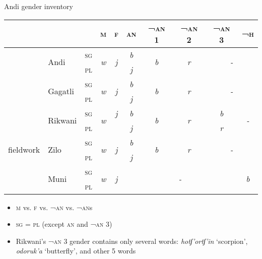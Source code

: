 \documentclass[13pt, t]{beamer}
\begin{document}
\begin{frame}{Andi gender inventory}
\small
\begin{tabular}{|l|l|c|c|c|c|c|c|c|c|}
\hline
\multicolumn{3}{|c|}{}  & \textsc{m} & \textsc{f} & \textsc{an} & \textsc{¬an} 1 & \textsc{¬an} 2 & \textsc{¬an} 3 & \textsc{¬h} \\ \hline
\multirow{2}{*}{\citep{alekseev99}} & \multirow{ 2}{*}{Andi} & \textsc{sg} & \multirow{2}{*}{\textit{w}} & \multirow{2}{*}{\textit{j}} & \textit{b} & \multirow{2}{*}{\textit{b}} & \multirow{2}{*}{\textit{r}} & \multicolumn{2}{|c|}{\multirow{2}{*}{\textit{-}}}  \\ \cline{3-3} \cline{6-6}
 &  & \textsc{pl} & \textit{} & \textit{} & \textit{j} & \textit{} & \textit{} & \multicolumn{2}{|c|}{} \\ \hline
\multirow{2}{*}{\citep{salimov10}} & \multirow{2}{*}{Gagatli} & \textsc{sg} & \multirow{2}{*}{\textit{w}} & \multirow{2}{*}{\textit{j}} & \textit{b} & \multirow{2}{*}{\textit{b}} & \multirow{2}{*}{\textit{r}} & \multicolumn{2}{|c|}{\multirow{2}{*}{\textit{-}}} \\ \cline{3-3} \cline{6-6}
 &  & \textsc{pl} & \textit{} & \textit{} & \textit{j} & \textit{} & \textit{} & \multicolumn{2}{|c|}{} \\ \hline
\multirow{2}{*}{\citep{suleymanov57}} & \multirow{2}{*}{Rikwani} & \textsc{sg} & \multirow{2}{*}{\textit{w}} & \textit{j} & \textit{b} & \multirow{2}{*}{\textit{b}} & \multirow{2}{*}{\textit{r}} & \textit{b} & \multirow{2}{*}{\textit{-}} \\ \cline{3-3} \cline{6-6} \cline{9-9}
 & & \textsc{pl} & \textit{} & \textit{} & \textit{j} & \textit{} & \textit{} & \textit{r} &  \\ \hline
\multirow{2}{*}{fieldwork} & \multirow{2}{*}{Zilo} & \textsc{sg} & \multirow{2}{*}{\textit{w}} & \multirow{2}{*}{\textit{j}} & \textit{b} & \multirow{2}{*}{\textit{b}} & \multirow{2}{*}{\textit{r}} & \multicolumn{2}{|c|}{\multirow{2}{*}{\textit{-}}}  \\ \cline{3-3} \cline{6-6}
 & & \textsc{pl} & \textit{} & \textit{} & \textit{j}& \textit{} & \textit{} & \multicolumn{2}{|c|}{}  \\ \hline
\multirow{2}{*}{\citep{suleymanov57}} & \multirow{2}{*}{Muni} & \textsc{sg} & \multirow{2}{*}{\textit{w}} & \multirow{2}{*}{\textit{j}} & \multicolumn{4}{|c|}{\multirow{2}{*}{\textit{-}}}  & \multirow{2}{*}{\textit{b}} \\ \cline{3-3}
 & & \textsc{pl} & \textit{} & \textit{} & \multicolumn{4}{|c|}{} &  \\ \hline
\end{tabular}
\normalsize
\begin{itemize}
\item \textsc{m} vs. \textsc{f} vs. \textsc{¬an} vs. \textsc{¬an}s 
\item \textsc{sg} = \textsc{pl} (except \textsc{an} and \textsc{¬an 3})
\item Rikwani's \textsc{¬an} 3 gender  contains only several words: \textit{hotʃ'ortʃ'in} `scorpion', \textit{odoruk'a} `butterfly', and other 5 words


\end{itemize}
\end{frame}
\end{document}
